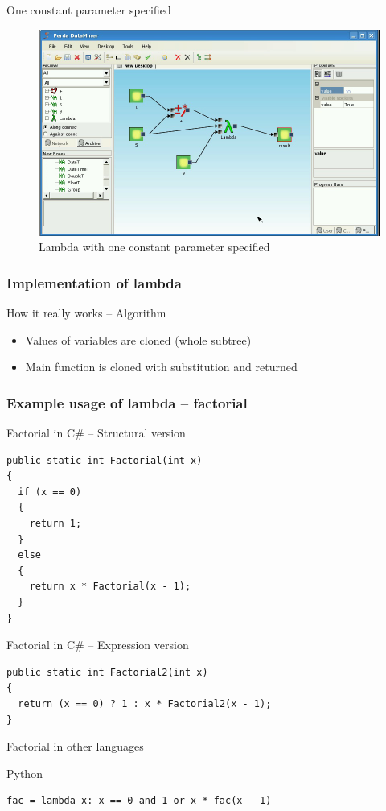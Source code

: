 \documentclass[a4paper,12pt]{book}
\begin{document}
One constant parameter specified
\begin{figure}
\includegraphics[width=13.72cm]{lambdaBasic3.png}
	\caption{Lambda with one constant parameter specified}
\end{figure}
	
\subsubsection{Implementation of lambda}
How it really works -- Algorithm
\begin{itemize}
	\item Values of variables are cloned (whole subtree)
	\item Main function is cloned with substitution and returned
\end{itemize}

\subsubsection{Example usage of lambda -- factorial}
Factorial in C\# -- Structural version

\begin{verbatim}
public static int Factorial(int x)
{
  if (x == 0)
  {
    return 1;
  }
  else
  {
    return x * Factorial(x - 1);
  }
}
\end{verbatim}
	
Factorial in C\# -- Expression version

\begin{verbatim}
public static int Factorial2(int x)
{
  return (x == 0) ? 1 : x * Factorial2(x - 1);
}
\end{verbatim}

Factorial in other languages

Python
\begin{verbatim}
fac = lambda x: x == 0 and 1 or x * fac(x - 1)
\end{verbatim}
\end{document}
